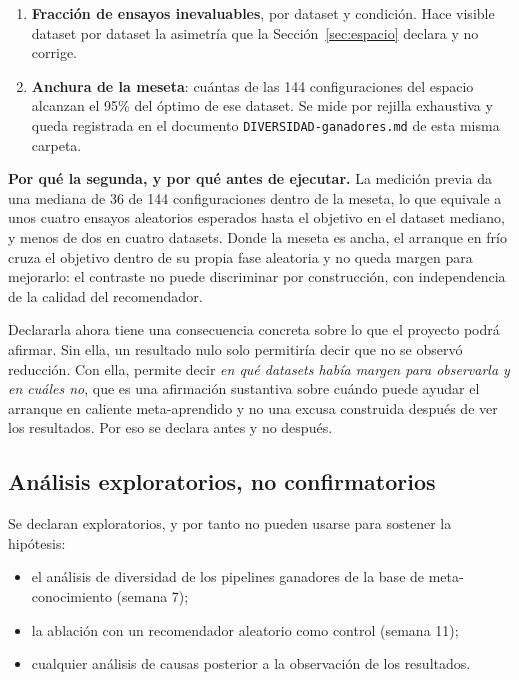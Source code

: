 \documentclass[11pt,letterpaper]{article}
\begin{document}
\begin{enumerate}
  \item \textbf{Fracción de ensayos inevaluables}, por dataset y condición. Hace
        visible dataset por dataset la asimetría que la
        Sección~\ref{sec:espacio} declara y no corrige.

  \item \textbf{Anchura de la meseta}: cuántas de las 144 configuraciones del
        espacio alcanzan el 95\% del óptimo de ese dataset. Se mide por rejilla
        exhaustiva y queda registrada en el documento
        \texttt{DIVERSIDAD-\allowbreak ganadores.md} de esta misma carpeta.
\end{enumerate}

\textbf{Por qué la segunda, y por qué antes de ejecutar.} La medición previa da
una mediana de 36 de 144 configuraciones dentro de la meseta, lo que equivale a
unos cuatro ensayos aleatorios esperados hasta el objetivo en el dataset mediano,
y menos de dos en cuatro datasets. Donde la meseta es ancha, el arranque en frío
cruza el objetivo dentro de su propia fase aleatoria y no queda margen para
mejorarlo: el contraste no puede discriminar por construcción, con independencia
de la calidad del recomendador.

Declararla ahora tiene una consecuencia concreta sobre lo que el proyecto podrá
afirmar. Sin ella, un resultado nulo solo permitiría decir que no se observó
reducción. Con ella, permite decir \emph{en qué datasets había margen para
observarla y en cuáles no}, que es una afirmación sustantiva sobre cuándo puede
ayudar el arranque en caliente meta-aprendido y no una excusa construida después
de ver los resultados. Por eso se declara antes y no después.

\subsection{Análisis exploratorios, no confirmatorios}

Se declaran exploratorios, y por tanto no pueden usarse para sostener la
hipótesis:

\begin{itemize}
  \item el análisis de diversidad de los pipelines ganadores de la base de
        meta-conocimiento (semana 7);
  \item la ablación con un recomendador aleatorio como control (semana 11);
  \item cualquier análisis de causas posterior a la observación de los
        resultados.
\end{itemize}
\end{document}
